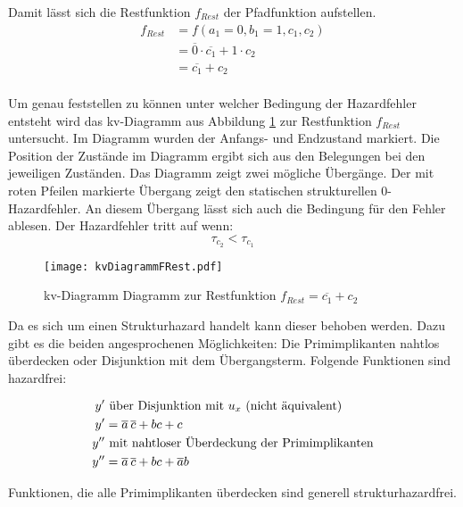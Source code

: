 Damit lässt sich die Restfunktion $f_{Rest}$ der Pfadfunktion aufstellen.
\begin{align*}
f_{Rest} &= f(a_1=0,b_1=1,c_1,c_2) \\ 
         &= \overline{0} \cdot \overline{c_1}  + 1 \cdot c_2 \\
         &= \overline{c_1} + c_2 \\
\end{align*}

Um genau feststellen zu können unter welcher Bedingung der Hazardfehler entsteht wird das {\sc kv}-Diagramm aus Abbildung \ref{kvFRest} zur Restfunktion $f_{Rest}$ untersucht. Im Diagramm wurden der Anfangs- und Endzustand markiert. Die Position der Zustände im Diagramm ergibt sich aus den Belegungen bei den jeweiligen Zuständen. Das Diagramm zeigt zwei mögliche Übergänge. Der mit roten Pfeilen markierte Übergang zeigt den statischen strukturellen 0-Hazardfehler. An diesem Übergang lässt sich auch die Bedingung für den Fehler ablesen. Der Hazardfehler tritt auf wenn:
$$\tau_{c_2} < \tau_{c_1}$$
\begin{figure}[htp]
	\centering
	\texttt{[image: kvDiagrammFRest.pdf]}
	\caption{{\sc kv}-Diagramm Diagramm zur Restfunktion $f_{Rest} = \overline{c_1} + c_2$}
	\label{kvFRest} 
\end{figure} 

Da es sich um einen Strukturhazard handelt kann dieser behoben werden. Dazu gibt es die beiden angesprochenen Möglichkeiten: Die Primimplikanten nahtlos überdecken oder Disjunktion mit dem Übergangsterm. Folgende Funktionen sind  hazardfrei:

\begin{align*}
y'  &\textnormal{ über Disjunktion mit $u_x$ (nicht äquivalent) } \\ 
y'  &= \overline{a}\hspace{2pt}\overline{c}  + bc + c  \\
y'' &\textnormal{ mit nahtloser Überdeckung der Primimplikanten} \\
y'' &= \overline{a}\hspace{2pt}\overline{c}  + bc + \overline{a}b \\
\end{align*}

Funktionen, die alle Primimplikanten überdecken sind generell strukturhazardfrei.




